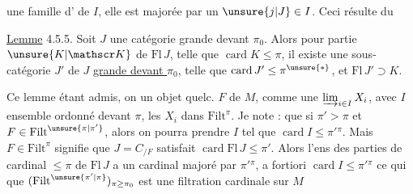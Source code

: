 une famille d' de $I$, elle est majorée par un $\unsure{j|J}\in I$. Ceci résulte du

\uline{Lemme} 4.5.5.  Soit $J$ une catégorie grande devant $\pi_0$. Alors pour  partie $\unsure{K|\mathscr K}$ de $\mathrm{Fl}\,J$, telle que $\operatorname{card}K\leq\pi$, il existe une sous-catégorie $J'$ de $J$ \uline{grande devant $\pi_0$}, telle que $\operatorname{card}J'\leq\pi^{\unsure{*}}$, et  $\mathrm{Fl}\,J'\supset K$.

 Ce lemme étant admis, on   un objet quelc. $F$ de $M$, comme une $\varinjlim_{i\in I}X_i$, avec $I$ ensemble ordonné  devant $\pi$, les $X_i$ dans $\mathrm{Filt}^{\pi}$. Je note :  que si $\pi'>\pi$ et $F\in\mathrm{Filt}^{\unsure{\pi|\pi'}}$, alors on pourra prendre $I$ tel que $\operatorname{card}I\leq\pi'{}^\pi$. Mais  $F\in\mathrm{Filt}^{\pi}$ signifie que $J=C_{/F}$ satisfait $\operatorname{card}\mathrm{Fl}\,J\leq\pi'$. Alors l'ens des parties de cardinal $\leq\pi$ de $\mathrm{Fl}\,J$  a un cardinal majoré par $\pi'{}^\pi$, a fortiori $\operatorname{card}I\leq\pi'{}^\pi$ ce qui  que $(\mathrm{Filt}^{\unsure{\pi'|\pi}})_{\pi\geq\pi_0}$ est une filtration cardinale sur $M$

